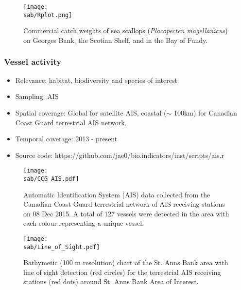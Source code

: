 \documentclass{beamer}
\numberwithin{equation}{section}		%
\numberwithin{figure}{section}		%
\numberwithin{table}{section}				%
\newcommand{\D}{.}
\newcommand{\bd}{\string~/bio\D data}   %
\newcommand{\sab}{\bd/mpa/sab}   %
\begin{document}

\begin{frame}[shrink]
\begin{figure}[h]
	\centering
 \texttt{[image: \\sab/Rplot.png]}
	\caption{Commercial catch weights of sea scallops (\textit{Placopecten magellanicus}) on Georges Bank, the Scotian Shelf, and in the Bay of Fundy.}
		\label{fig:Scallop}
\end{figure}
\end{frame}




\begin{frame}[shrink]
\frametitle{Vessel activity}
\begin{itemize}
	\item Relevance:  habitat, biodiversity and species of interest
	\item Sampling:  AIS
	\item Spatial coverage: Global for satellite AIS, coastal ($\sim$ 100km) for Canadian Coast Guard terrestrial AIS network.
	\item Temporal coverage: 2013 - present
	\item Source code: https://github.com/jae0/bio.indicators/inst/scripts/ais.r
\end{itemize}	
\end{frame}



\begin{frame}[shrink]

\begin{figure}[h]
  \centering
	\texttt{[image: \\sab/CCG\_AIS.pdf]}
	\caption{Automatic Identification System (AIS) data collected from the Canadian Coast Guard terrestrial network of AIS receiving stations on 08 Dec 2015. A total of 127 vessels were detected in the area with each colour representing a unique vessel.}
    \label{fig:TAIS}
\end{figure}


\end{frame}




\begin{frame}[shrink]

\begin{figure}[h]
	\centering
	\texttt{[image: \\sab/Line\_of\_Sight.pdf]}
	\caption{Bathymetic (100 m resolution) chart of the  St. Anns Bank area with line of sight detection (red circles) for the terrestrial AIS receiving stations (red dots) around St. Anns Bank Area of Interest.}
   \label{fig:LOF}
\end{figure}

\end{frame}
\end{document}

